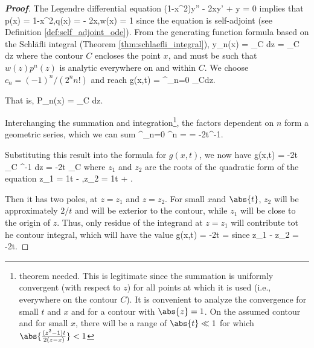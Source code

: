 \begin{proof}[\bf Proof]
The Legendre differential equation 
\be
(1-x^2)y'' - 2xy' + \lm y = 0
\ee
implies that
\be
p(x) = 1-x^2,\quad q(x) = - 2x,\quad w(x) = 1
\ee
since the equation is self-adjoint (see Definition \ref{def:self_adjoint_ode}). From the generating function formula based on the Schl\"afli integral (Theorem \ref{thm:schlaefli_integral}),
\be
y_n(x) =  \oint_C dz =  \oint_C dz 
\ee
where the contour $C$ encloses the point $x$, and must be such that $w(z)p^n(z)$ is analytic everywhere on and within $C$. We choose $c_n = (-1)^n/(2^nn!)$ and reach
\be
g(x,t) = \sum^\infty_{n=0}  \oint_Cdz.
\ee

That is,
\be
P_n(x) =  \oint_C dz.
\ee

Interchanging the summation and integration\footnote{theorem needed. This is legitimate since the summation is uniformly convergent (with respect to $z$) for all points at which it is used (i.e., everywhere on the contour $C$). It is convenient to analyze the convergence for small $t$ and $x$ and for a contour with $\abs{z}=1$. On the assumed contour and for small $x$, there will be a range of $\abs{t}\ll 1$ for which $\abs{\frac{(z^2-1)t}{2(z-x)}}<1$}, the factors dependent on $n$ form a geometric series, which we can sum
\be
\sum^\infty_{n=0} ^n  =  = -\frac 2t^{-1}.
\ee

Substituting this result into the formula for $g(x,t)$, we now have
\be
g(x,t) = -\frac 2t  \oint_C ^{-1} dz = -\frac 2t  \oint_C 
\ee
where $z_1$ and $z_2$ are the roots of the quadratic form of the equation
\be
z_1 = \frac 1t - ,\quad z_2 = \frac 1t + .
\ee

Then it has two poles, at $z=z_1$ and $z=z_2$. For small $x$and $\abs{t}$, $z_2$ will be approximately $2/t$ and will be exterior to the contour, while $z_1$ will be close to the origin of $z$. Thus, only residue of the integrand at $z=z_1$ will contribute tot he contour integral, which will have the value
\be
g(x,t) = -\frac 2t  = 
\ee
since
\be
z_1 - z_2 = -\frac 2t.
\ee
\end{proof}


